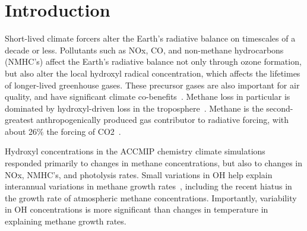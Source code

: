\section{Introduction}



Short-lived climate forcers alter the Earth's radiative balance on timescales of a decade or less. Pollutants such as NOx, CO, and non-methane hydrocarbons (NMHC's) affect the Earth's radiative balance not only through ozone formation, but also alter the local hydroxyl radical concentration, which affects the lifetimes of longer-lived greenhouse gases. These precursor gases are also important for air quality, and have significant climate co-benefits~\citep{ref:driscoll2015}. Methane loss in particular is dominated by hydroxyl-driven loss in the troposphere~\citep{ref:kirschke2013}. Methane is the second-greatest anthropogenically produced gas contributor to radiative forcing, with about 26\% the forcing of CO2~\citep{ref:myhre2013}.


Hydroxyl concentrations in the ACCMIP chemistry climate simulations~\citep{ref:voulgarakis2013} responded primarily to changes in methane concentrations, but also to changes in NOx, NMHC's, and photolysis rates. Small variations in OH help explain interannual variations in methane growth rates~\citep{ref:mcnorton2016}, including the recent hiatus in the growth rate of atmospheric methane concentrations. Importantly, variability in OH concentrations is more significant than changes in temperature in explaining methane growth rates.


